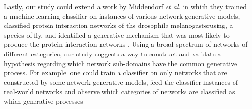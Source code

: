 \documentclass[..]{revtex4}
\begin{document}
Lastly, our study could extend a work by Middendorf \textit{et al.} in which they trained a machine learning classifier on instances of various network generative models, classified protein interaction networks of the drosophila melanogasterusing, a species of fly, and identified a generative mechanism that was most likely to produce the protein interaction networks \cite{MechanismInference}. Using a broad spectrum of networks of different categories, our study suggests a way to construct and validate a hypothesis regarding which network sub-domains have the common generative process. For example, one could train a classifier on only networks that are constructed by some network generative models, feed the classifier instances of real-world networks and observe which categories of networks are classified as which generative processes.

\clearpage


 
\end{document}
